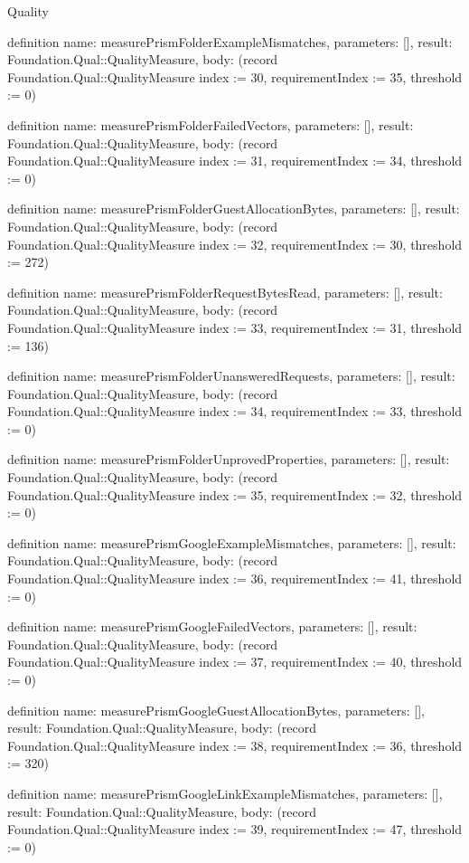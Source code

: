 \begin{lexlean}{Quality}
\begin{semanticmodule}
definition{
  name: measurePrismFolderExampleMismatches,
  parameters: [],
  result: Foundation.Qual::QualityMeasure,
  body: (record Foundation.Qual::QualityMeasure {index := 30, requirementIndex := 35, threshold := 0})
}

definition{
  name: measurePrismFolderFailedVectors,
  parameters: [],
  result: Foundation.Qual::QualityMeasure,
  body: (record Foundation.Qual::QualityMeasure {index := 31, requirementIndex := 34, threshold := 0})
}

definition{
  name: measurePrismFolderGuestAllocationBytes,
  parameters: [],
  result: Foundation.Qual::QualityMeasure,
  body: (record Foundation.Qual::QualityMeasure {index := 32, requirementIndex := 30, threshold := 272})
}

definition{
  name: measurePrismFolderRequestBytesRead,
  parameters: [],
  result: Foundation.Qual::QualityMeasure,
  body: (record Foundation.Qual::QualityMeasure {index := 33, requirementIndex := 31, threshold := 136})
}

definition{
  name: measurePrismFolderUnansweredRequests,
  parameters: [],
  result: Foundation.Qual::QualityMeasure,
  body: (record Foundation.Qual::QualityMeasure {index := 34, requirementIndex := 33, threshold := 0})
}

definition{
  name: measurePrismFolderUnprovedProperties,
  parameters: [],
  result: Foundation.Qual::QualityMeasure,
  body: (record Foundation.Qual::QualityMeasure {index := 35, requirementIndex := 32, threshold := 0})
}

definition{
  name: measurePrismGoogleExampleMismatches,
  parameters: [],
  result: Foundation.Qual::QualityMeasure,
  body: (record Foundation.Qual::QualityMeasure {index := 36, requirementIndex := 41, threshold := 0})
}

definition{
  name: measurePrismGoogleFailedVectors,
  parameters: [],
  result: Foundation.Qual::QualityMeasure,
  body: (record Foundation.Qual::QualityMeasure {index := 37, requirementIndex := 40, threshold := 0})
}

definition{
  name: measurePrismGoogleGuestAllocationBytes,
  parameters: [],
  result: Foundation.Qual::QualityMeasure,
  body: (record Foundation.Qual::QualityMeasure {index := 38, requirementIndex := 36, threshold := 320})
}

definition{
  name: measurePrismGoogleLinkExampleMismatches,
  parameters: [],
  result: Foundation.Qual::QualityMeasure,
  body: (record Foundation.Qual::QualityMeasure {index := 39, requirementIndex := 47, threshold := 0})
}


\end{semanticmodule}
\end{lexlean}
